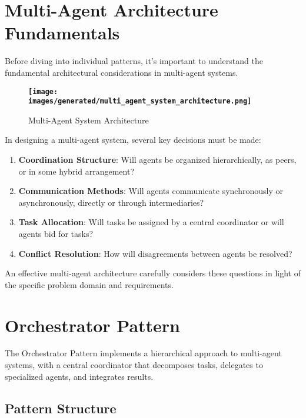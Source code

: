 \documentclass[11pt,oneside]{book}
\providecommand{\pandocbounded}[1]{\textbf{#1}}
\providecommand{\tightlist}{%
  \setlength{\itemsep}{0pt}\setlength{\parskip}{0pt}}
\begin{document}
\section{Multi-Agent Architecture
Fundamentals}\label{multi-agent-architecture-fundamentals}

Before diving into individual patterns, it's important to understand the
fundamental architectural considerations in multi-agent systems.

\begin{figure}
\centering
\pandocbounded{\texttt{[image: images/generated/multi\_agent\_system\_architecture.png]}}
\caption{Multi-Agent System Architecture}
\end{figure}

In designing a multi-agent system, several key decisions must be made:

\begin{enumerate}
\def\labelenumi{\arabic{enumi}.}
\tightlist
\item
  \textbf{Coordination Structure}: Will agents be organized
  hierarchically, as peers, or in some hybrid arrangement?
\item
  \textbf{Communication Methods}: Will agents communicate synchronously
  or asynchronously, directly or through intermediaries?
\item
  \textbf{Task Allocation}: Will tasks be assigned by a central
  coordinator or will agents bid for tasks?
\item
  \textbf{Conflict Resolution}: How will disagreements between agents be
  resolved?
\end{enumerate}

An effective multi-agent architecture carefully considers these
questions in light of the specific problem domain and requirements.

\section{Orchestrator Pattern}\label{orchestrator-pattern}

The Orchestrator Pattern implements a hierarchical approach to
multi-agent systems, with a central coordinator that decomposes tasks,
delegates to specialized agents, and integrates results.

\subsection{Pattern Structure}\label{pattern-structure-6}
\end{document}
